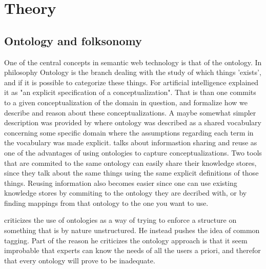 
\chapter{Theory} %
\label{Theory} %


\section{Ontology and folksonomy}
One of the central concepts in semantic web technology is that of the ontology. 
In philosophy Ontology is the branch dealing with the study of which things 'exists', and if it is possible to categorize these things. 
For artificial intelligence \citet{Gruber1993} explained it as "an explicit specification of a conceptualization". 
That is than one commits to a given conceptualization of the domain in question, and formalize how we describe and reason about these conceptualizations. 
A maybe somewhat simpler description was provided by \citet{Guarino1998} where ontology was described as a shared vocabulary 
concerning some specific domain where the assumptions regarding each term in the vocabulary was made explicit.
\citet{Pretorius2004} talks about informastion sharing and reuse as one of the advantages of using ontologies to 
capture conceptualizations. 
Two tools that are commited to the same ontology can easily share their knowledge stores, 
since they talk about the same things using the same explicit definitions of those things.
Reusing information also becomes easier since one can use existing knowledge stores by commiting to the ontology they are
decribed with, or by finding mappings from that ontology to the one you want to use.


\citet{Shirky2007} criticizes the use of ontologies as a way of trying to enforce a structure on something that is by nature unstructured. 
He instead pushes the idea of common tagging. 
Part of the reason he criticizes the ontology approach is that it seem improbable that experts can know the needs of all the users a priori, and therefor that every ontology will prove to be inadequate.

